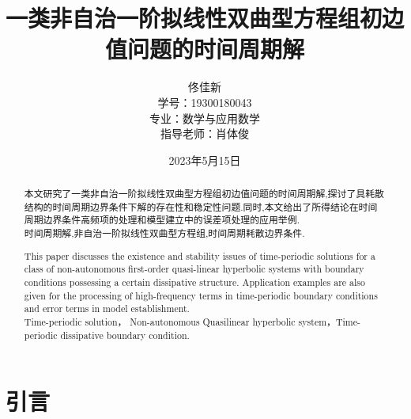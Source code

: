 \documentclass[notitlepage,cs4size,punct,oneside]{ctexrep}
\title{{\zihao{1}\heiti{} 一类非自治一阶拟线性双曲型方程组初边值问题的时间周期解}}
\author{佟佳新\\学号：19300180043\\专业：数学与应用数学\\指导老师：肖体俊}
\date{2023年5月15日}
\numberwithin{equation}{chapter}
\theoremstyle{mystyle}
\begin{document}
\CTEXoptions[abstractname={摘要：}]
\CTEXoptions[bibname={\heiti 参考文献}]

\renewcommand{\thepage}{\roman{page}}
\setcounter{page}{1}
\tableofcontents\clearpage

\maketitle\renewcommand{\thepage}{\arabic{page}}
\thispagestyle{empty}\setcounter{page}{0}
\renewcommand{\abstractname}{摘要}
\begin{abstract}
    本文研究了一类非自治一阶拟线性双曲型方程组初边值问题的时间周期解,探讨了具耗散结构的时间周期边界条件下解的存在性和稳定性问题.同时,本文给出了所得结论在时间周期边界条件高频项的处理和模型建立中的误差项处理的应用举例.\\
     时间周期解,非自治一阶拟线性双曲型方程组,时间周期耗散边界条件.
\end{abstract}
\renewcommand {\abstractname}{Abstract}
\begin{abstract}
    This paper discusses the existence and stability issues of time-periodic solutions for a class of non-autonomous first-order quasi-linear hyperbolic systems with boundary conditions possessing a certain dissipative structure. Application examples are also given for the processing of high-frequency terms in time-periodic boundary conditions and error terms in model establishment.\\
     Time-periodic solution，  Non-autonomous Quasilinear hyperbolic system，Time-periodic dissipative boundary condition.
\end{abstract}

\chapter{引言}
\end{document}
